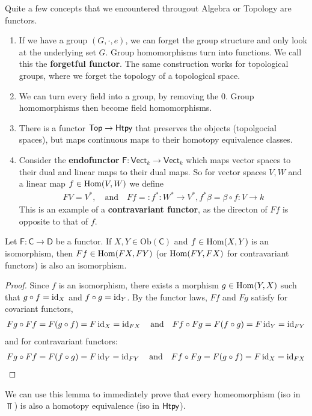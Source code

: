 \begin{ex}[]
  Quite a few concepts that we encountered througout Algebra or Topology are functors.
  \begin{enumerate}
    \item If we have a group $(G,\cdot,e)$, we can forget the group structure and only look at the underlying set $G$.
      Group homomorphisms turn into functions.
      We call this the \textbf{forgetful functor}.
      The same construction works for topological groups, where we forget the topology of a topological space.
    \item We can turn every field into a group, by removing the $0$. Group homomorphisms then become field homomorphisms.
    \item There is a functor $\text{\sffamily Top} \to \text{\sffamily Htpy}$ that preserves the objects (topolgocial spaces), but maps continuous maps to their homotopy equivalence classes.
    \item Consider the \textbf{endofunctor} $\textsf{F}: \textsf{Vect}_k \to  \textsf{Vect}_k$ which maps vector spaces to their dual and linear maps to their dual maps.
      So for vector spaces $V,W$ and a linear map $f \in \operatorname{Hom}(V,W)$ we define
      \begin{align*}
        F V = V^{\ast}, \quad \text{and} \quad Ff =: f^{\ast}: W^{\ast} \to  V^{\ast}, f^{\ast} \beta = \beta \circ f : V \to k
      \end{align*}
      This is an example of a \textbf{contravariant functor}, as the directon of $Ff$ is opposite to that of $f$.
  \end{enumerate}
\end{ex}


\begin{lem}[]\label{lem:func-iso}
Let $\textsf{F}: \textsf{C} \to  \textsf{D}$ be a functor.
If $X,Y \in \text{Ob}(\textsf{C})$ and $f \in \operatorname{Hom}(X,Y)$ is an isomorphism, then $Ff \in \operatorname{Hom}(FX,FY)$ (or $\operatorname{Hom}(FY,FX)$ for contravariant functors) is also an isomorphism.
\end{lem}
\begin{proof}
  Since $f$ is an isomorphism, there exists a morphism $g \in \operatorname{Hom}(Y,X)$ such that $g \circ f = \operatorname{id}_X$ and $f \circ g = \operatorname{id}_Y$.
  By the functor laws, $Ff$ and $Fg$ satisfy for covariant functors, 
  \begin{align*}
    Fg \circ Ff = F(g \circ f) = F \operatorname{id}_X = \operatorname{id}_{FX} \quad \text{and} \quad Ff \circ Fg = F(f \circ g) = F \operatorname{id}_Y = \operatorname{id}_{FY}
  \end{align*}
  and for contravariant functors:
  \begin{align*}
    Fg \circ Ff = F(f \circ g) = F \operatorname{id}_Y = \operatorname{id}_{F Y} \quad \text{and} \quad Ff \circ Fg = F(g \circ f) = F \operatorname{id}_X = \operatorname{id}_{F X}
  \end{align*}
\end{proof}
We can use this lemma to immediately prove that every homeomorphism (iso in $\Top$) is also a homotopy equivalence (iso in $\text{\sffamily Htpy}$).



